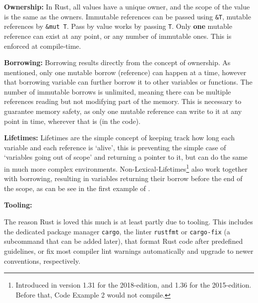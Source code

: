
\textbf{Ownership:}\label{sec:ownership}
In Rust, all values have a unique owner, and the scope of the value is the same
as the owners. Immutable references can be passed using \verb|&T|, mutable
references by \verb|&mut T|. Pass by value works by passing \verb|T|. Only
\textbf{one} mutable reference can exist at any point, or any number of
immutable ones. This is enforced at compile-time.

\textbf{Borrowing:}\label{sec:borrowing}
Borrowing results directly from the concept of ownership. As mentioned, only one mutable
borrow (reference) can happen at a time, however that borrowing variable can
further borrow it to other variables or functions. The number of immutable
borrows is unlimited, meaning there can be multiple references reading but not
modifying part of the memory. This is necessary to guarantee memory safety, as
only one mutable reference can write to it at any point in time, wherever that
is (in the code).

\textbf{Lifetimes:}\label{sec:lifetimes}
Lifetimes are the simple concept of keeping track how long each variable and
each reference is `alive', this is preventing the simple case of `variables
going out of scope' and returning a pointer to it, but can do the same in much
more complex environments. Non-Lexical-Lifetimes\footnote{Introduced in version
1.31 for the 2018-edition, and 1.36 for the 2015-edition. Before that, Code
Example 2 would not compile.} also work together with borrowing, resulting in
variables returning their borrow before the end of the scope, as can be see in
the first example of .

\textbf{Tooling:}\label{sec:tools}

The reason Rust is loved \cite{rustloved} this much is at least partly due to
tooling. This includes the dedicated package manager \verb|cargo|, the linter
\verb|rustfmt| or \verb|cargo-fix| (a subcommand that can be added later), that
format Rust code after predefined guidelines, or fix most compiler lint warnings
automatically and upgrade to newer conventions, respectively.

